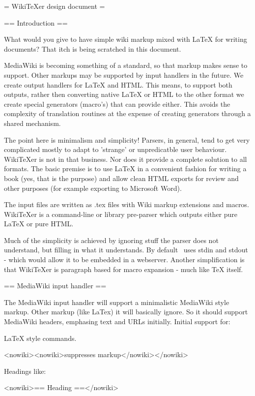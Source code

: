= WikiTeXer design document =

== Introduction ==


What would you give to have simple wiki markup mixed with LaTeX for
writing documents? That itch is being scratched in this document. 

MediaWiki is becoming something of a standard, so that markup makes
sense to support. Other markups may be supported by input handlers in
the future. We create output handlers for LaTeX and HTML. This means,
to support both outputs, rather then converting native LaTeX or HTML
to the other format we create special generators (macro's) that can
provide either. This avoids the complexity of translation routines at the
expense of creating generators through a shared mechanism.

The point here is minimalism and simplicity! Parsers, in general, tend
to get very complicated mostly to adapt to 'strange' or unpredicatble
user behaviour. WikiTeXer is not in that business. Nor does it provide
a complete solution to all formats. The basic premise is to use LaTeX
in a convenient fashion for writing a book (yes, that is the purpose)
and allow clean HTML exports for review and other purposes (for
example exporting to Microsoft Word).

The input files are written as .tex files with Wiki markup extensions
and macros. WikiTeXer is a command-line or library pre-parser which
outputs either pure LaTeX or pure HTML.

Much of the simplicity is achieved by ignoring stuff the parser does
not understand, but filling in what it understands. By default
\wikitexer\ uses stdin and stdout - which would allow it to be
embedded in a webserver. Another simplification is that WikiTeXer is 
paragraph based for macro expansion - much like TeX itself.


== MediaWiki input handler ==

The MediaWiki input handler will support a minimalistic MediaWiki style 
markup. Other markup (like LaTex) it will basically ignore. So it should
support MediaWiki headers, emphasing text and URLs initially. Initial 
support for:

LaTeX style commands.

<nowiki><nowiki>suppresses markup</nowiki></nowiki>

Headings like:

<nowiki>== Heading ==</nowiki>

